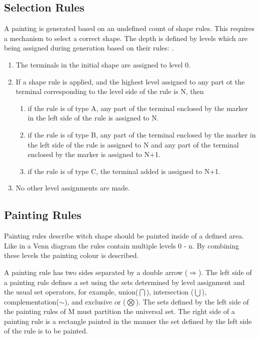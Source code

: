 \documentclass[11pt, a4paper]{report}
\begin{document}
\subsection{Selection Rules}
\label{sec:Shape_Grammar_Selection_Rules}
A painting is generated based on an undefined count of shape rules. This requires a mechanism to select a correct shape. The depth is defined by levels which are being assigned during generation based on their rules: \citep{shapeGrammars:1972}.
\begin{displayquote}
    \begin{enumerate}
        \item The terminals in the initial shape are assigned to level 0.
        \item If a shape rule is applied, and the highest level assigned to any part ot the terminal corresponding to the level side of the rule is N, then
        \begin{enumerate}
            \item if the rule is of type A, any part of the terminal enclosed by the marker in the left side of the rule is assigned to N.
            \item if the rule is of type B, any part of the terminal enclosed by the marker in the left side of the rule is assigned to N and any part of the terminal enclosed by the marker is assigned to N+1.
            \item if the rule is of type C, the terminal added is assigned to N+1.
        \end{enumerate}
        \item No other level assignments are made.
    \end{enumerate}
\end{displayquote}

\subsection{Painting Rules}
\label{sec:Shape_Grammar_Painting_Rules}
Painting rules describe witch shape should be painted inside of a defined area. Like in a Venn diagram the rules contain multiple levels 0 - n. By combining these levels the painting colour is described\citep{shapeGrammars:1972}.
\begin{displayquote}
    A painting rule has two sides separated by a double arrow ($\Rightarrow$). The left side of a painting rule defines a set using the sets determined by level assignment and the usual set operators, for example, union($\bigcap$), intersection ($\bigcup$), complementation($\sim$), and exclusive or ($\bigotimes$). The sets defined by the left side of the painting rules of M must partition the universal set. The right side of a painting rule is a rectangle painted in the manner the set defined by the left side of the rule is to be painted.
\end{displayquote}
\end{document}
